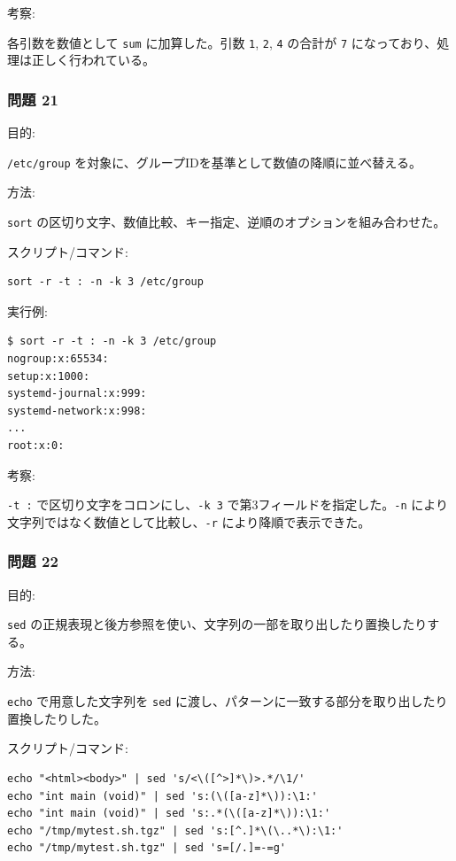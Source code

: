 \documentclass[12pt,a4paper]{jsarticle}
\begin{document}
考察:\par
各引数を数値として \texttt{sum} に加算した。引数 \texttt{1}, \texttt{2}, \texttt{4} の合計が \texttt{7} になっており、処理は正しく行われている。

\vspace{0.7cm}

\subsubsection*{問題 21}
目的:\par
\texttt{/etc/group} を対象に、グループIDを基準として数値の降順に並べ替える。

方法:\par
\texttt{sort} の区切り文字、数値比較、キー指定、逆順のオプションを組み合わせた。

スクリプト/コマンド:\par
\begin{lstlisting}
sort -r -t : -n -k 3 /etc/group
\end{lstlisting}

実行例:\par
\begin{lstlisting}
$ sort -r -t : -n -k 3 /etc/group
nogroup:x:65534:
setup:x:1000:
systemd-journal:x:999:
systemd-network:x:998:
...
root:x:0:
\end{lstlisting}

考察:\par
\texttt{-t :} で区切り文字をコロンにし、\texttt{-k 3} で第3フィールドを指定した。\texttt{-n} により文字列ではなく数値として比較し、\texttt{-r} により降順で表示できた。

\vspace{0.7cm}

\subsubsection*{問題 22}
目的:\par
\texttt{sed} の正規表現と後方参照を使い、文字列の一部を取り出したり置換したりする。

方法:\par
\texttt{echo} で用意した文字列を \texttt{sed} に渡し、パターンに一致する部分を取り出したり置換したりした。

スクリプト/コマンド:\par
\begin{lstlisting}
echo "<html><body>" | sed 's/<\([^>]*\)>.*/\1/'
echo "int main (void)" | sed 's:(\([a-z]*\)):\1:'
echo "int main (void)" | sed 's:.*(\([a-z]*\)):\1:'
echo "/tmp/mytest.sh.tgz" | sed 's:[^.]*\(\..*\):\1:'
echo "/tmp/mytest.sh.tgz" | sed 's=[/.]=-=g'
\end{lstlisting}
\end{document}
